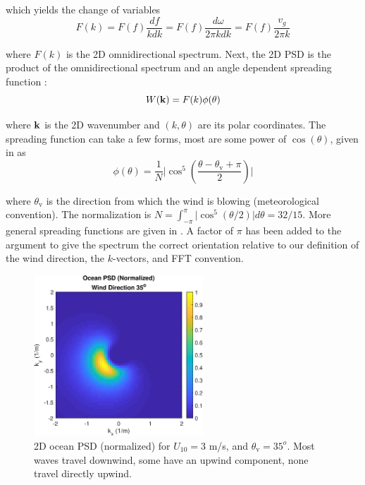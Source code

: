\noindent which yields the change of variables
\begin{equation}
F(k) = F(f) \dfrac{df}{k dk} = F(f) \dfrac{d\omega}{2\pi k dk} = F(f) \dfrac{v_g}{2\pi k}
\end{equation}

\noindent where $F(k)$ is the 2D omnidirectional spectrum.  Next, the 2D PSD is the product of the omnidirectional spectrum and an angle dependent spreading function \cite{soriano2006doppler}:
\begin{equation}
W(\mathbf{k}) = F(k)\phi(\theta)
\end{equation}

\noindent where $\mathbf{k}$ is the 2D wavenumber and $(k,\theta)$ are its polar coordinates.  The spreading function can take a few forms, most are some power of $\cos(\theta)$, given in \cite{soriano2006doppler} as
\begin{equation}
\phi(\theta) = \dfrac{1}{N} \biggl \vert \cos^5\left(\dfrac{\theta-\theta_{\textrm{v}}+\pi}{2}\right) \biggr \vert
\end{equation}

\noindent where $\theta_{\textrm{v}}$ is the direction from which the wind is blowing (meteorological convention).  The normalization is $N = \int_{-\pi}^{\pi} \vert \cos^5(\theta/2)\vert d\theta = 32/15$.  More general spreading functions are given in \cite{hasselmann1980directional,niedzwecki1991comparative}.  A factor of $\pi$ has been added to the argument to give the spectrum the correct orientation relative to our definition of the wind direction, the $k$-vectors, and FFT convention.  

\begin{figure}[htbp] 
   \centering
   \includegraphics[width=2.5in]{RandomObjects/Figures/oceanPSD} 
   \caption{2D ocean PSD (normalized) for $U_{10} = 3$ m/s, and $\theta_{\textrm{v}} = 35^o$. Most waves travel downwind, some have an upwind component, none travel directly upwind.}
\end{figure}

